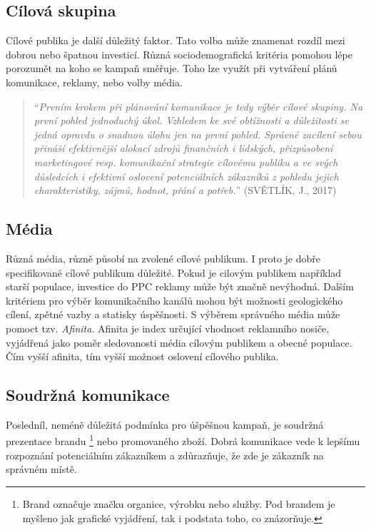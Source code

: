 \subsection{Cílová skupina}
Cílové publika je další důležitý faktor. Tato volba může znamenat rozdíl mezi dobrou nebo špatnou investicí. Různá sociodemografická kritéria pomohou lépe porozumět
na koho se kampaň směřuje. Toho lze využít při vytváření plánů komunikace, reklamy, nebo volby média.
\begin{quote}
    \enquote{\emph{Prvním krokem
    při plánování komunikace je tedy výběr cílové skupiny. Na první pohled jednoduchý úkol. Vzhledem
    ke své obtížnosti a důležitosti se jedná opravdu o snadnou úlohu jen na první pohled. Správné zacílení
    sebou přináší efektivnější alokací zdrojů finančních i lidských, přizpůsobení marketingové resp.
    komunikační strategie cílovému publiku a ve svých důsledcích i efektivní oslovení potenciálních
    zákazníků z pohledu jejich charakteristiky, zájmů, hodnot, přání a potřeb.}} (SVĚTLÍK, J., 2017) \cite{svetlik:reklama}
\end{quote}

\subsection{Média}
Různá média, různě působí na zvolené cílové publikum. I proto je dobře specifikované cílové publikum důležité. Pokud je cilovým publikem například starší populace, investice
do PPC reklamy může být značně nevýhodná. Dalším kritériem pro výběr komunikačního kanálů mohou být možnosti geologického cílení, zpětné vazby a statisky úspěšnosti.
S výběrem správného média může pomoct tzv. \emph{Afinita}. Afinita je index určující vhodnost reklamního nosiče, vyjádřená jako poměr sledovanosti média cílovým publikem
a obecné populace. Čím vyšší afinita, tím vyšší možnost oslovení cílového publika.

\subsection{Soudržná komunikace}
Posledníl, neméně důležitá podmínka pro úšpěšnou kampaň, je soudržná prezentace brandu
\footnote{Brand označuje značku organice, výrobku nebo služby. Pod brandem je myšleno jak grafické vyjádření, tak i podstata toho, co znázorňuje.}
nebo promovaného zboží. Dobrá komunikace vede k lepšímu rozpoznání potenciálním zákazníkem a zdůrazňuje, že zde je zákazník na správném místě.

